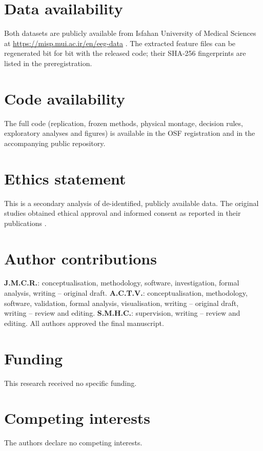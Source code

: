 \documentclass[11pt,letterpaper]{article}
\begin{document}
\section*{Data availability}
Both datasets are publicly available from Isfahan University of Medical Sciences at \url{https://misp.mui.ac.ir/en/eeg-data} \citep{kashefpoor2016,kashefpoor2019}. The extracted feature files can be regenerated bit for bit with the released code; their SHA-256 fingerprints are listed in the preregistration.

\section*{Code availability}
The full code (replication, frozen methods, physical montage, decision rules, exploratory analyses and figures) is available in the OSF registration and in the accompanying public repository.

\section*{Ethics statement}
This is a secondary analysis of de-identified, publicly available data. The original studies obtained ethical approval and informed consent as reported in their publications \citep{kashefpoor2016,kashefpoor2019}.

\section*{Author contributions}
\textbf{J.M.C.R.}: conceptualisation, methodology, software, investigation, formal analysis, writing -- original draft. \textbf{A.C.T.V.}: conceptualisation, methodology, software, validation, formal analysis, visualisation, writing -- original draft, writing -- review and editing. \textbf{S.M.H.C.}: supervision, writing -- review and editing. All authors approved the final manuscript.

\section*{Funding}
This research received no specific funding.

\section*{Competing interests}
The authors declare no competing interests.



\end{document}
